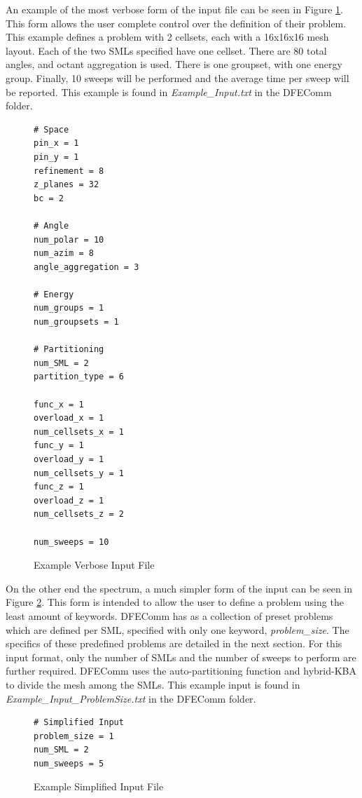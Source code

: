 \documentclass{article}
\begin{document}
An example of the most verbose form of the input file can be seen in Figure \ref{fig::verbose}. This form allows the user complete control over the definition of their problem. This example defines a problem with 2 cellsets, each with a 16x16x16 mesh layout. Each of the two SMLs specified have one cellset. There are 80 total angles, and octant aggregation is used. There is one groupset, with one energy group. Finally, 10 sweeps will be performed and the average time per sweep will be reported. This example is found in \emph{Example\_Input.txt} in the DFEComm folder.\\
\begin{figure}[H]
\begin{verbatim}
# Space
pin_x = 1
pin_y = 1
refinement = 8
z_planes = 32
bc = 2

# Angle
num_polar = 10
num_azim = 8
angle_aggregation = 3

# Energy
num_groups = 1
num_groupsets = 1
  	
# Partitioning
num_SML = 2
partition_type = 6
  	
func_x = 1
overload_x = 1
num_cellsets_x = 1
func_y = 1
overload_y = 1
num_cellsets_y = 1
func_z = 1
overload_z = 1
num_cellsets_z = 2

num_sweeps = 10
\end{verbatim}
  \caption[]{Example Verbose Input File}\label{fig::verbose}
\end{figure}

On the other end the spectrum, a much simpler form of the input can be seen in Figure \ref{fig::simplified}. This form is intended to allow the user to define a problem using the least amount of keywords. DFEComm has as a collection of preset problems which are defined per SML, specified with only one keyword, \emph{problem\_size}. The specifics of these predefined problems are detailed in the next section. For this input format, only the number of SMLs and the number of sweeps to perform are further required. DFEComm uses the auto-partitioning function and hybrid-KBA to divide the mesh among the SMLs. This example input is found in \emph{Example\_Input\_ProblemSize.txt} in the DFEComm folder.\\

\begin{figure}[H]
\begin{verbatim}
# Simplified Input
problem_size = 1
num_SML = 2
num_sweeps = 5
\end{verbatim}  
    \caption[]{Example Simplified Input File}\label{fig::simplified}
\end{figure}
\end{document}
